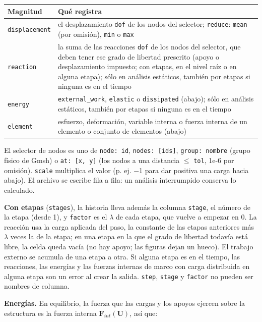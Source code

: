 \documentclass[11pt,oneside]{report}
\begin{document}
\begin{center}
\begin{tabularx}{\textwidth}{YY}
\hline
\textbf{Magnitud} & \textbf{Qué registra} \\
\hline
\texttt{displacement} & el desplazamiento \texttt{dof} de los nodos del selector; \texttt{reduce}: \texttt{mean} (por omisión), \texttt{min} o \texttt{max} \\
\texttt{reaction} & la suma de las reacciones \texttt{dof} de los nodos del selector, que deben tener ese grado de libertad prescrito (apoyo o desplazamiento impuesto; con etapas, en el nivel raíz o en alguna etapa); sólo en análisis estáticos, también por etapas si ninguna es en el tiempo \\
\texttt{energy} & \texttt{external\_work}, \texttt{elastic} o \texttt{dissipated} (abajo); sólo en análisis estáticos, también por etapas si ninguna es en el tiempo \\
\texttt{element} & esfuerzo, deformación, variable interna o fuerza interna de un elemento o conjunto de elementos (abajo) \\
\hline
\end{tabularx}
\end{center}
El selector de nodos es uno de \texttt{node: id}, \texttt{nodes: [ids]}, \texttt{group: nombre} (grupo físico de Gmsh) o \texttt{at: [x, y]} (los nodos a una distancia \ensuremath{\le} \texttt{tol}, 1e-6 por omisión). \texttt{scale} multiplica el valor (p. ej. −1 para dar positiva una carga hacia abajo). El archivo se escribe fila a fila: un análisis interrumpido conserva lo calculado.

\textbf{Con etapas} (\texttt{stages}), la historia lleva además la columna \texttt{stage}, el número de la etapa (desde 1), y \texttt{factor} es el \ensuremath{\lambda} de cada etapa, que vuelve a empezar en 0. La reacción usa la carga aplicada del paso, la constante de las etapas anteriores más \ensuremath{\lambda} veces la de la etapa; en una etapa en la que el grado de libertad todavía está libre, la celda queda vacía (no hay apoyo; las figuras dejan un hueco). El trabajo externo se acumula de una etapa a otra. Si alguna etapa es en el tiempo, las reacciones, las energías y las fuerzas internas de marco con carga distribuida en alguna etapa son un error al crear la salida. \texttt{step}, \texttt{stage} y \texttt{factor} no pueden ser nombres de columna.

\textbf{Energías.} En equilibrio, la fuerza que las cargas y los apoyos ejercen sobre la estructura es la fuerza interna $\mathbf F_{int}(\mathbf U)$, así que:
\end{document}

